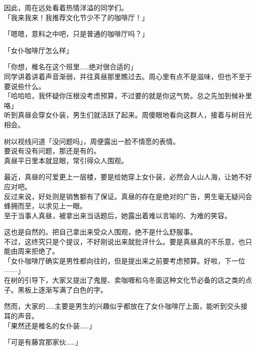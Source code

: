 因此，周在远处看着热情洋溢的同学们。\\

「我来我来！我推荐文化节少不了的咖啡厅！」

「嗯嗯，意料之中吧，只是普通的咖啡厅吗？」

「女仆咖啡厅怎么样」

「你想，椎名在这个班里……绝对很合适的」\\

同学讲着讲着声音渐弱，并往真昼那里瞧过去。周心里有点不是滋味，但也不至于要说些什么。\\

「哈哈哈，我怀疑你压根没考虑预算，不过要的就是你这气势。总之先加到候补里咯」\\

听到真昼会穿女仆装，男生们就活跃了起来。周傻眼地看向这群人，接着与树目光相会。

树以视线问道「没问题吗」，周便露出一脸不情愿的表情。\\

要说有没有问题，那还是有的。\\

真昼平日里本就显眼，常引得众人围观。

最近，真昼的可爱更上一层楼，要是给她穿上女仆装，必然会人山人海，让她不好应对吧。\\

反过来说，好处则是销售额有了保证。真昼的存在是绝对的广告，男生毫无疑问会蜂拥而至，以求见上一眼。\\

至于当事人真昼，被拿出来当话题后，她露出着难以言喻的、为难的笑容。

这也是自然的。把自己拿出来受众人围观，绝不是什么舒服事。\\

不过，这终究只是个提议，不好刚说出来就批评什么。要是真昼真的不乐意，也只能由周来拒绝了。\\

「女仆咖啡厅确实是男性都向往的，但是提出来之前要考虑预算。好啦，下一位——」\\

在树的引导下，大家又提出了鬼屋、卖咖喱和乌冬面这种文化节必备的店之类的点子。黑板上逐渐写满了白色的字。

然而，大家的……主要是男生的兴趣似乎都放在了女仆咖啡厅上面，能听到交头接耳的声音。\\

「果然还是椎名的女仆装……」

「可是有藤宫那家伙……」

